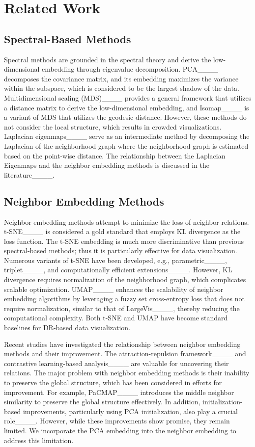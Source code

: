 \section{Related Work}
\label{sec:related_works}
\subsection{Spectral-Based Methods}
\label{subsec:spectral_methods}
Spectral methods are grounded in the spectral theory and derive the low-dimensional embedding through eigenvalue decomposition. PCA____ decomposes the covariance matrix, and its embedding maximizes the variance within the subspace, which is considered to be the largest shadow of the data. Multidimensional scaling (MDS)____ provides a general framework that utilizes a distance matrix to derive the low-dimensional embedding, and Isomap____ is a variant of MDS that utilizes the geodesic distance. However, these methods do not consider the local structure, which results in crowded visualizations. Laplacian eigenmaps____ serve as an intermediate method by decomposing the Laplacian of the neighborhood graph where the neighborhood graph is estimated based on the point-wise distance. The relationship between the Laplacian Eigenmaps and the neighbor embedding methods is discussed in the literature____.

\subsection{Neighbor Embedding Methods}
\label{subsec:ne_methods}
Neighbor embedding methods attempt to minimize the loss of neighbor relations. t-SNE____ is considered a gold standard that employs KL divergence as the loss function. The t-SNE embedding is much more discriminative than previous spectral-based methods; thus it is particularly effective for data visualization. Numerous variants of t-SNE have been developed, e.g., parametric____, triplet____, and computationally efficient extensions____. However, KL divergence requires normalization of the neighborhood graph, which complicates scalable optimization. UMAP____ enhances the scalability of neighbor embedding algorithms by leveraging a fuzzy set cross-entropy loss that does not require normalization, similar to that of LargeVis____, thereby reducing the computational complexity. Both t-SNE and UMAP have become standard baselines for DR-based data visualization. 
\par
Recent studies have investigated the relationship between neighbor embedding methods and their improvement. The attraction-repulsion framework____ and contrastive learning-based analysis____ are valuable for uncovering their relations. The major problem with neighbor embedding methods is their inability to preserve the global structure, which has been considered in efforts for improvement. For example, PaCMAP____ introduces the middle neighbor similarity to preserve the global structure effectively. In addition, initialization-based improvements, particularly using PCA initialization, also play a crucial role____. However, while these improvements show promise, they remain limited. We incorporate the PCA embedding into the neighbor embedding to address this limitation.